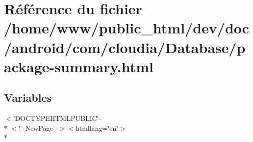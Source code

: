 \hypertarget{com_2cloudia_2_database_2package-summary_8html}{\section{Référence du fichier /home/www/public\-\_\-html/dev/doc/android/com/cloudia/\-Database/package-\/summary.html}
\label{com_2cloudia_2_database_2package-summary_8html}
}
\subsection*{Variables}
\begin{DoxyCompactItemize}
\item 
$<$!D\-O\-C\-T\-Y\-P\-E\-H\-T\-M\-L\-P\-U\-B\-L\-I\-C\char`\"{}-\/\\*
$<$!-\/-\/New\-Page-\/-\/$>$$<$htmllang=\char`\"{}en\char`\"{}$>$\\*
$$
\end{DoxyCompactItemize}
